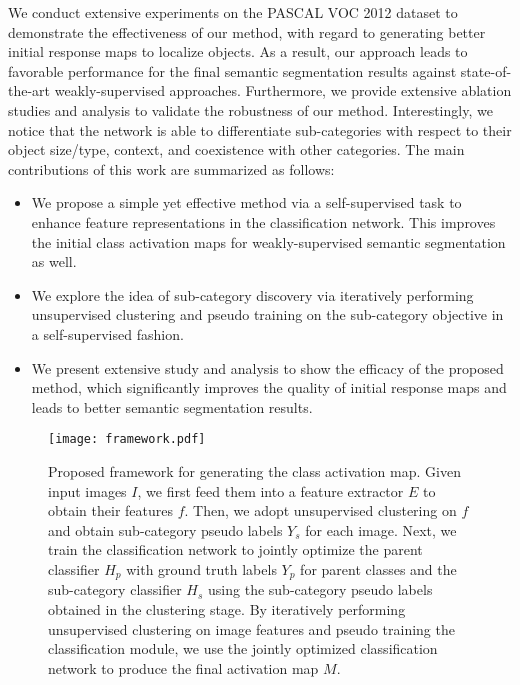 \documentclass[10pt,twocolumn,letterpaper]{article}
\begin{document}
We conduct extensive experiments on the PASCAL VOC 2012 dataset \cite{PASCAL_VOC_2010_Data} to demonstrate the effectiveness of our method, with regard to generating better initial response maps to localize objects.
As a result, our approach leads to favorable performance for the final semantic segmentation results against state-of-the-art weakly-supervised approaches.
Furthermore, we provide extensive ablation studies and analysis to validate the robustness of our method.
Interestingly, we notice that the network is able to differentiate sub-categories with respect to their object size/type, context, and coexistence with other categories.
The main contributions of this work are summarized as follows:
\begin{itemize}
    \item We propose a simple yet effective method via a self-supervised task to enhance feature representations in the classification network. This  improves the initial class activation maps for weakly-supervised semantic segmentation as well.
    
    \item We explore the idea of sub-category discovery via iteratively performing unsupervised clustering and pseudo training on the sub-category objective in a self-supervised fashion.
    
    \item We present extensive study and analysis to show the efficacy of the proposed method, which significantly improves the quality of initial response maps and leads to better semantic segmentation results.
    
    
\end{itemize}













\begin{figure*}[t]
	\centering
	\texttt{[image: framework.pdf]}\\
\caption{
		Proposed framework for generating the class activation map. 
Given input images $I$, we first feed them into a feature extractor $E$ to obtain their features $f$.
Then, we adopt unsupervised clustering on $f$ and obtain sub-category pseudo labels $Y_s$ for each image.
Next, we train the classification network to jointly optimize the parent classifier $H_p$ with ground truth labels $Y_p$ for parent classes and the sub-category classifier $H_s$ using the sub-category pseudo labels obtained in the clustering stage.
By iteratively performing unsupervised clustering on image features and pseudo training the classification module, we use the jointly optimized classification network to produce the final activation map $M$.
	}
	\label{fig: framework}
	\vspace{-3mm}
\end{figure*}
\end{document}
